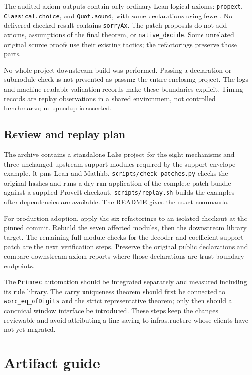 \documentclass[11pt,letterpaper]{article}
\newcommand{\code}[1]{\nolinkurl{#1}}
\begin{document}
The audited axiom outputs contain only ordinary Lean logical axioms: \code{propext}, \code{Classical.choice}, and \code{Quot.sound}, with some declarations using fewer. No delivered checked result contains \code{sorryAx}. The patch proposals do not add axioms, assumptions of the final theorem, or \code{native_decide}. Some unrelated original source proofs use their existing tactics; the refactorings preserve those parts.

No whole-project downstream build was performed. Passing a declaration or submodule check is not presented as passing the entire enclosing project. The logs and machine-readable validation records make these boundaries explicit. Timing records are replay observations in a shared environment, not controlled benchmarks; no speedup is asserted.

\subsection{Review and replay plan}

The archive contains a standalone Lake project for the eight mechanisms and three unchanged upstream support modules required by the support-envelope example. It pins Lean and Mathlib. \code{scripts/check_patches.py} checks the original hashes and runs a dry-run application of the complete patch bundle against a supplied ProveIt checkout. \code{scripts/replay.sh} builds the examples after dependencies are available. The README gives the exact commands.

For production adoption, apply the six refactorings to an isolated checkout at the pinned commit. Rebuild the seven affected modules, then the downstream library target. The remaining full-module checks for the decoder and coefficient-support patch are the next verification steps. Preserve the original public declarations and compare downstream axiom reports where those declarations are trust-boundary endpoints.

The \code{Primrec} automation should be integrated separately and measured including its rule library. The carry uniqueness theorem should first be connected to \code{word_eq_ofDigits} and the strict representative theorem; only then should a canonical window interface be introduced. These steps keep the changes reviewable and avoid attributing a line saving to infrastructure whose clients have not yet migrated.

\section{Artifact guide}
\end{document}
